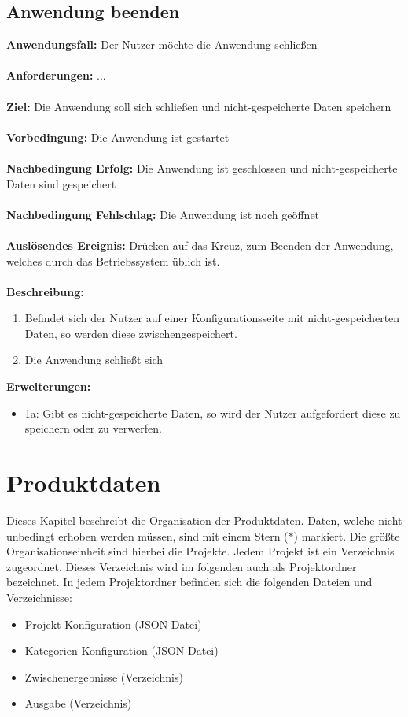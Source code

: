 \documentclass[parskip=full]{scrartcl} %
\begin{document}
\subsection*{Anwendung beenden}
\textbf{Anwendungsfall:} Der Nutzer möchte die Anwendung schließen\\\\
\textbf{Anforderungen:} ...\\\\
\textbf{Ziel:} Die Anwendung soll sich schließen und nicht-gespeicherte Daten speichern \\\\
\textbf{Vorbedingung:} Die Anwendung ist gestartet\\\\
\textbf{Nachbedingung Erfolg:} Die Anwendung ist geschlossen und nicht-gespeicherte Daten sind gespeichert\\\\
\textbf{Nachbedingung Fehlschlag:} Die Anwendung ist noch geöffnet \\\\
\textbf{Auslösendes Ereignis:} Drücken auf das Kreuz, zum Beenden der Anwendung, welches durch das Betriebssystem üblich ist. \\\\
\textbf{Beschreibung:}
\begin{enumerate}
    \item Befindet sich der Nutzer auf einer Konfigurationsseite mit nicht-gespeicherten Daten, so werden diese zwischengespeichert.
    \item Die Anwendung schließt sich
\end{enumerate}
\textbf{Erweiterungen:} 
\begin{itemize}
    \item 1a: Gibt es nicht-gespeicherte Daten, so wird der Nutzer aufgefordert diese zu speichern oder zu verwerfen.
\end{itemize}
\newpage









\section{Produktdaten}
Dieses Kapitel beschreibt die Organisation der Produktdaten. Daten, welche nicht unbedingt erhoben werden müssen, sind mit einem Stern ($\ast$) markiert. Die größte Organisationseinheit sind hierbei die Projekte. Jedem Projekt ist ein Verzeichnis zugeordnet. Dieses Verzeichnis wird im folgenden auch als Projektordner bezeichnet. In jedem Projektordner befinden sich die folgenden Dateien und Verzeichnisse:
\begin{itemize}
    \item Projekt-Konfiguration (JSON-Datei)
    \item Kategorien-Konfiguration (JSON-Datei)
    \item Zwischenergebnisse (Verzeichnis)
    \item Ausgabe (Verzeichnis)
\end{itemize}
\end{document}
